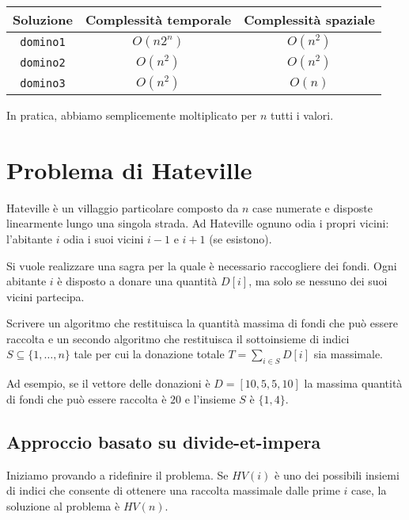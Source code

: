 \begin{table}[h!]
    \centering
    \renewcommand{\arraystretch}{1.2}
    \begin{tabular}{|c|c|c|}
        \hline
        \textbf{Soluzione} & \textbf{Complessità temporale} & \textbf{Complessità
        spaziale} \\
        \hline
        \texttt{domino1} & $O(n2^n)$ & $O(n^2)$\\
        \hline
        \texttt{domino2} & $O(n^2)$ & $O(n^2)$\\
        \hline
        \texttt{domino3} & $O(n^2)$ & $O(n)$\\
        \hline
    \end{tabular}
\end{table}
\begin{note}
    In pratica, abbiamo semplicemente moltiplicato per $n$ tutti i valori.
\end{note}

\section{Problema di Hateville}
\begin{problem}[Hateville]
    Hateville è un villaggio particolare composto da $n$ case numerate e
    disposte linearmente lungo una singola strada. Ad Hateville ognuno odia i
    propri vicini: l'abitante $i$ odia i suoi vicini $i-1$ e $i+1$ (se esistono).

    Si vuole realizzare una sagra per la quale è necessario raccogliere dei fondi.
    Ogni abitante $i$ è disposto a donare una quantità $D[i]$, ma solo se nessuno
    dei suoi vicini partecipa.

    Scrivere un algoritmo che restituisca la quantità massima di fondi che può
    essere raccolta e un secondo algoritmo che restituisca il sottoinsieme di
    indici $S\subseteq\{1,\dots,n\}$ tale per cui la donazione totale $T=\sum_{i
    \in S}D[i]$ sia massimale.
\end{problem}\noindent
Ad esempio, se il vettore delle donazioni è $D=[10,5,5,10]$ la massima quantità
di fondi che può essere raccolta è $20$ e l'insieme $S$ è $\{1,4\}$.

\subsection{Approccio basato su divide-et-impera}
Iniziamo provando a ridefinire il problema. Se $HV(i)$ è uno dei possibili
insiemi di indici che consente di ottenere una raccolta massimale dalle prime
$i$ case, la soluzione al problema è $HV(n)$.


